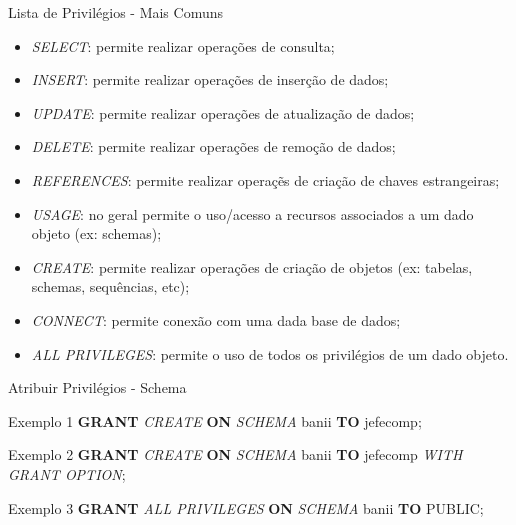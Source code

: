 \documentclass[xcolor=x11names,compress]{beamer}
\begin{document}
\begin{frame}[allowframebreaks]{Lista de Privilégios - Mais Comuns}

\begin{itemize}
\itemsep 5mm

\item \textit{SELECT}:  permite realizar operações de consulta;

\item \textit{INSERT}: permite realizar operações de inserção de dados;

\item \textit{UPDATE}: permite realizar operações de atualização de dados;

 \item \textit{DELETE}: permite realizar operações de remoção de dados;
  
\item \textit{REFERENCES}: permite realizar operaçẽs de criação de chaves estrangeiras;

\item \textit{USAGE}: no geral permite o uso/acesso a recursos associados a um dado objeto (ex: schemas);

\item \textit{CREATE}: permite realizar operações de criação de objetos (ex: tabelas, schemas, sequências, etc);

\item \textit{CONNECT}: permite conexão com uma dada base de dados;

\item \textit{ALL PRIVILEGES}: permite o uso de todos os privilégios de um dado objeto.

\end{itemize}
\end{frame}

\begin{frame}{Atribuir Privilégios - Schema}

\begin{alertblock}{Exemplo 1}
\textbf{GRANT} \textit{CREATE} \textbf{ON} \textit{SCHEMA} banii \textbf{TO} jefecomp;
\end{alertblock}

\begin{alertblock}{Exemplo 2}
\textbf{GRANT} \textit{CREATE} \textbf{ON} \textit{SCHEMA} banii \textbf{TO} jefecomp \textit{WITH GRANT OPTION};
\end{alertblock}

\begin{alertblock}{Exemplo 3}
\textbf{GRANT} \textit{ALL PRIVILEGES} \textbf{ON} \textit{SCHEMA} banii \textbf{TO} PUBLIC;
\end{alertblock}

\end{frame}
\end{document}

